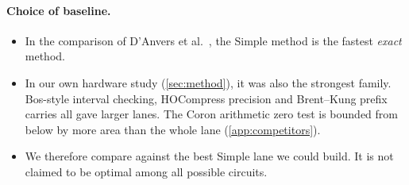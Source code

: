 \paragraph{Choice of baseline.}
\begin{itemize}
  \item In the comparison of D'Anvers et al.~\cite{danvers2023}, the Simple method is the fastest \emph{exact} method.
  \item In our own hardware study (\cref{sec:method}), it was also the strongest family. Bos-style interval checking, HOCompress precision and Brent--Kung prefix carries all gave larger lanes. The Coron arithmetic zero test is bounded from below by more area than the whole \PAMS{} lane (\cref{app:competitors}).
  \item We therefore compare against the best Simple lane we could build. It is not claimed to be optimal among all possible circuits.
\end{itemize}
